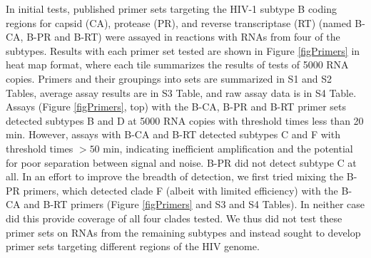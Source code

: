 \documentclass[../sherrill-Mix_thesis.tex]{subfiles}
\begin{document}
	In initial tests, published primer sets targeting the HIV-1 subtype B coding regions for capsid (CA), protease (PR), and reverse transcriptase (RT) (named B-CA, B-PR and B-RT) were assayed in reactions with RNAs from four of the subtypes. Results with each primer set tested are shown in Figure \ref{figPrimers} in heat map format, where each tile summarizes the results of tests of 5000 RNA copies. Primers and their groupings into sets are summarized in S1 and S2 Tables, average assay results are in S3 Table, and raw assay data is in S4 Table. Assays (Figure \ref{figPrimers}, top) with the B-CA, B-PR and B-RT primer sets detected subtypes B and D at 5000 RNA copies with threshold times less than 20 min. However, assays with B-CA and B-RT detected subtypes C and F with threshold times $>50$ min, indicating inefficient amplification and the potential for poor separation between signal and noise. B-PR did not detect subtype C at all. In an effort to improve the breadth of detection, we first tried mixing the B-PR primers, which detected clade F (albeit with limited efficiency) with the B-CA and B-RT primers (Figure \ref{figPrimers} and S3 and S4 Tables). In neither case did this provide coverage of all four clades tested. We thus did not test these primer sets on RNAs from the remaining subtypes and instead sought to develop primer sets targeting different regions of the HIV genome.
\end{document}
